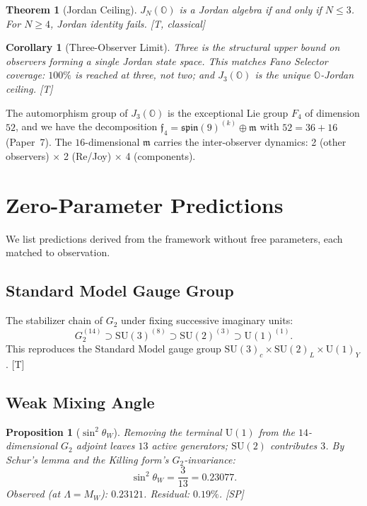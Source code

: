 \documentclass[11pt, a4paper]{article}
\newtheorem{theorem}{Theorem}
\newtheorem{proposition}{Proposition}
\newtheorem{corollary}{Corollary}
\newcommand{\Oct}{\mathbb{O}}
\begin{document}
\begin{theorem}[Jordan Ceiling]
\label{thm:jordan_ceiling}
$J_N(\Oct)$ is a Jordan algebra if and only if $N \leq 3$. For
$N \geq 4$, Jordan identity fails. [T, classical]
\end{theorem}

\begin{corollary}[Three-Observer Limit]
\label{cor:three_observer}
Three is the structural upper bound on observers forming a single
Jordan state space. This matches Fano Selector coverage: $100\%$ is
reached at three, not two; and $J_3(\Oct)$ is the unique $\Oct$-Jordan
ceiling. [T]
\end{corollary}

The automorphism group of $J_3(\Oct)$ is the exceptional Lie group
$F_4$ of dimension $52$, and we have the decomposition
$\mathfrak{f}_4 = \mathfrak{spin}(9)^{(k)} \oplus \mathfrak{m}$ with
$52 = 36 + 16$ (Paper~7). The $16$-dimensional $\mathfrak{m}$ carries
the inter-observer dynamics: 2 (other observers) $\times$ 2 (Re/Joy)
$\times$ 4 (components).


\section{Zero-Parameter Predictions}
\label{sec:predictions}

We list predictions derived from the framework without free
parameters, each matched to observation.

\subsection{Standard Model Gauge Group}

The stabilizer chain of $G_2$ under fixing successive imaginary units:
\begin{equation}
G_2^{(14)} \supset \mathrm{SU}(3)^{(8)} \supset \mathrm{SU}(2)^{(3)} \supset \mathrm{U}(1)^{(1)}.
\end{equation}
This reproduces the Standard Model gauge group
$\mathrm{SU}(3)_c \times \mathrm{SU}(2)_L \times \mathrm{U}(1)_Y$. [T]

\subsection{Weak Mixing Angle}

\begin{proposition}[$\sin^2\theta_W$]
Removing the terminal $\mathrm{U}(1)$ from the $14$-dimensional $G_2$
adjoint leaves $13$ active generators; $\mathrm{SU}(2)$ contributes $3$.
By Schur's lemma and the Killing form's $G_2$-invariance:
\begin{equation}
\sin^2\theta_W = \frac{3}{13} = 0.23077.
\end{equation}
Observed (at $\Lambda = M_W$): $0.23121$. Residual: $0.19\%$. [SP]
\end{proposition}
\end{document}
